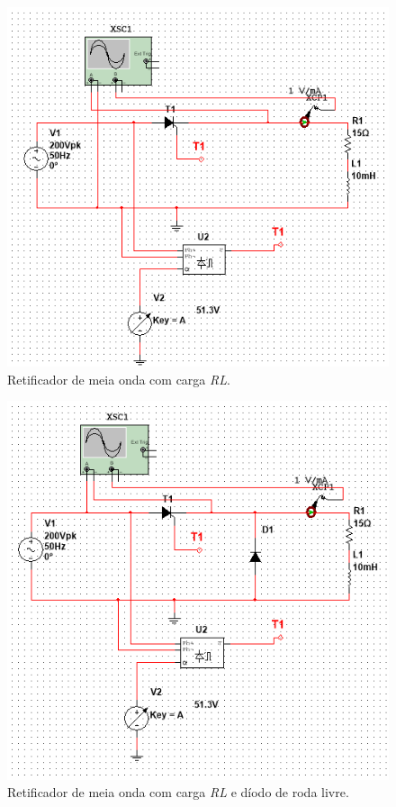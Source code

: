 \documentclass[a4paper,11pt]{article}
\numberwithin{equation}{section}
\begin{document}
\begin{figure}[h]
	\centering
	\includegraphics[keepaspectratio=true, scale=0.5]{img/circuito2}
	\caption{Retificador de meia onda com carga \textit{RL}.}
	\label{fig:circuit_4}
	\vspace{-0.8em}
\end{figure}

\begin{figure}[h]
	\centering
	\includegraphics[keepaspectratio=true, scale=0.5]{img/circuito3}
	\caption{Retificador de meia onda com carga \textit{RL} e díodo de roda livre.}
	\label{fig:circuit_5}
	\vspace{-0.8em}
\end{figure}
\pagebreak 
\end{document}
